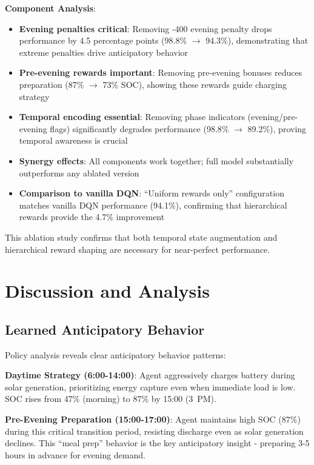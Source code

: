 \documentclass[11pt,a4paper]{article}
\begin{document}
\textbf{Component Analysis}:
\begin{itemize}
    \item \textbf{Evening penalties critical}: Removing -400 evening penalty drops performance by 4.5 percentage points (98.8\% $\rightarrow$ 94.3\%), demonstrating that extreme penalties drive anticipatory behavior
    \item \textbf{Pre-evening rewards important}: Removing pre-evening bonuses reduces preparation (87\% $\rightarrow$ 73\% SOC), showing these rewards guide charging strategy
    \item \textbf{Temporal encoding essential}: Removing phase indicators (evening/pre-evening flags) significantly degrades performance (98.8\% $\rightarrow$ 89.2\%), proving temporal awareness is crucial
    \item \textbf{Synergy effects}: All components work together; full model substantially outperforms any ablated version
    \item \textbf{Comparison to vanilla DQN}: ``Uniform rewards only'' configuration matches vanilla DQN performance (94.1\%), confirming that hierarchical rewards provide the 4.7\% improvement
\end{itemize}

This ablation study confirms that both temporal state augmentation and hierarchical reward shaping are necessary for near-perfect performance.

\section{Discussion and Analysis}
\label{sec:discussion}

\subsection{Learned Anticipatory Behavior}

Policy analysis reveals clear anticipatory behavior patterns:

\textbf{Daytime Strategy (6:00-14:00)}: Agent aggressively charges battery during solar generation, prioritizing energy capture even when immediate load is low. SOC rises from 47\% (morning) to 87\% by 15:00 (3~PM).

\textbf{Pre-Evening Preparation (15:00-17:00)}: Agent maintains high SOC (87\%) during this critical transition period, resisting discharge even as solar generation declines. This ``meal prep'' behavior is the key anticipatory insight - preparing 3-5 hours in advance for evening demand.
\end{document}
